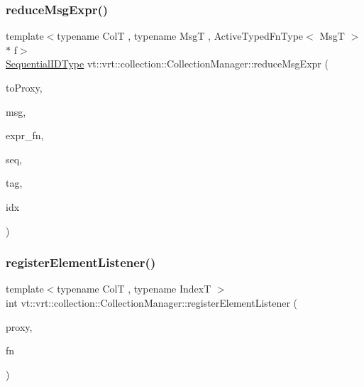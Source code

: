 \subsubsection{\texorpdfstring{reduce\+Msg\+Expr()}{reduceMsgExpr()}\hspace{0.1cm}{\footnotesize\ttfamily [2/2]}}
{\footnotesize\ttfamily template$<$typename ColT , typename MsgT , Active\+Typed\+Fn\+Type$<$ Msg\+T $>$ $\ast$ f$>$ \\
\hyperlink{namespacevt_a3063d4db3b879d6dd2c7b8d50995c7f6}{Sequential\+I\+D\+Type} vt\+::vrt\+::collection\+::\+Collection\+Manager\+::reduce\+Msg\+Expr (\begin{DoxyParamCaption}\item[{\hyperlink{structvt_1_1vrt_1_1collection_1_1_collection_manager_a56458ed7f9bb22b631b9b3a745f42f94}{Collection\+Proxy\+Wrap\+Type}$<$ ColT, typename Col\+T\+::\+Index\+Type $>$ const \&}]{to\+Proxy,  }\item[{MsgT $\ast$const}]{msg,  }\item[{\hyperlink{structvt_1_1vrt_1_1collection_1_1_collection_manager_a47a3227ae0195c15187e8dc8762f66c4}{Reduce\+Idx\+Func\+Type}$<$ typename Col\+T\+::\+Index\+Type $>$}]{expr\+\_\+fn,  }\item[{\hyperlink{namespacevt_a3063d4db3b879d6dd2c7b8d50995c7f6}{Sequential\+I\+D\+Type}}]{seq,  }\item[{\hyperlink{namespacevt_a84ab281dae04a52a4b243d6bf62d0e52}{Tag\+Type}}]{tag,  }\item[{typename Col\+T\+::\+Index\+Type const \&}]{idx }\end{DoxyParamCaption})}

\mbox{\label{structvt_1_1vrt_1_1collection_1_1_collection_manager_a790738e12739058e7a09b4a3246169e8}} 
\subsubsection{\texorpdfstring{register\+Element\+Listener()}{registerElementListener()}}
{\footnotesize\ttfamily template$<$typename ColT , typename IndexT $>$ \\
int vt\+::vrt\+::collection\+::\+Collection\+Manager\+::register\+Element\+Listener (\begin{DoxyParamCaption}\item[{\hyperlink{namespacevt_a1b417dd5d684f045bb58a0ede70045ac}{Virtual\+Proxy\+Type}}]{proxy,  }\item[{\hyperlink{namespacevt_1_1vrt_1_1collection_1_1listener_a62d04c44a3c187eae66bdba2090b4505}{listener\+::\+Listen\+Fn\+Type}$<$ IndexT $>$}]{fn }\end{DoxyParamCaption})}



